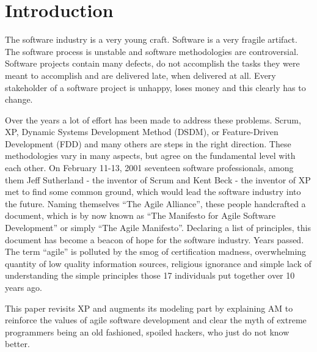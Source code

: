 \section{Introduction}
The software industry is a very young craft. Software is a very
fragile artifact. The software process is unstable and software methodologies
are controversial. Software projects contain many defects, do not accomplish
the tasks they were meant to accomplish and are delivered late, when delivered at
all. Every stakeholder of a software project is unhappy, loses money and this
clearly has to change.

Over the years a lot of effort has been made to address these problems. Scrum,
XP, Dynamic Systems Development Method (DSDM), or Feature-Driven Development
(FDD) and many others are steps in the right direction. These methodologies vary
in many aspects, but agree on the fundamental level with each other. On
February 11-13, 2001 seventeen software professionals, among them Jeff
Sutherland - the inventor of Scrum and Kent Beck - the inventor of XP met to
find some common ground, which would lead the software industry into the future.
Naming themselves \enquote{The Agile Alliance}, these people handcrafted a
document, which is by now known as \enquote{The Manifesto for Agile Software
Development} or simply \enquote{The Agile Manifesto}. Declaring a list of
principles, this document has become a beacon of hope for the software industry.
Years passed. The term \enquote{agile} is polluted by the smog of certification
madness, overwhelming quantity of low quality information sources, religious
ignorance and simple lack of understanding the simple principles those 17
individuals put together over 10 years ago.

This paper revisits XP and augments its modeling part by explaining AM to
reinforce the values of agile software development and clear the myth of
extreme programmers being an old fashioned, spoiled hackers, who just do not
know better.

